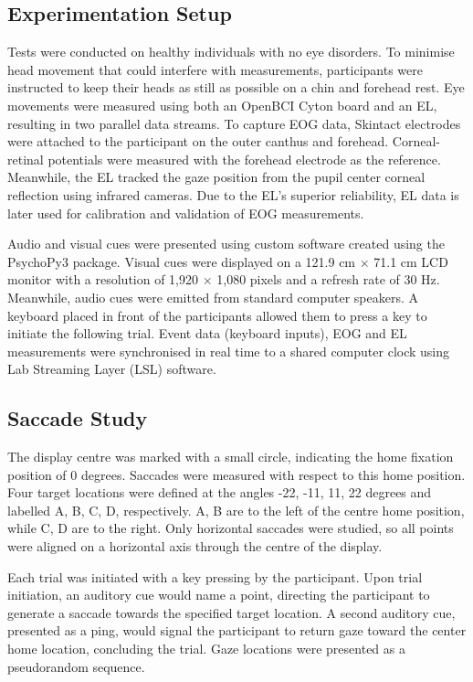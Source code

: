 \documentclass[transmag]{IEEEtran}
\begin{document}
\subsection{Experimentation Setup}
Tests were conducted on healthy individuals with no eye disorders. To minimise head movement that could interfere with measurements, participants were instructed to keep their heads as still as possible on a chin and forehead rest. Eye movements were measured using both an OpenBCI Cyton board and an EL, resulting in two parallel data streams. To capture EOG data, Skintact electrodes were attached to the participant on the outer canthus and forehead. Corneal-retinal potentials were measured with the forehead electrode as the reference. Meanwhile, the EL tracked the gaze position from the pupil center corneal reflection using infrared cameras. Due to the EL's superior reliability, EL data is later used for calibration and validation of EOG measurements.

Audio and visual cues were presented using custom software created using the PsychoPy3 package. Visual cues were displayed on a 121.9 \si{\centi\metre} $\times$ 71.1 \si{\centi\metre} LCD monitor with a resolution of 1,920 $\times$ 1,080 pixels and a refresh rate of 30 \si{\hertz}. Meanwhile, audio cues were emitted from standard computer speakers. A keyboard placed in front of the participants allowed them to press a key to initiate the following trial. Event data (keyboard inputs), EOG and EL measurements were synchronised in real time to a shared computer clock using Lab Streaming Layer (LSL) software.

\subsection{Saccade Study}

The display centre was marked with a small circle, indicating the home fixation position of 0 degrees. Saccades were measured with respect to this home position. Four target locations were defined at the angles -22, -11, 11, 22 degrees and labelled A, B, C, D, respectively. A, B are to the left of the centre home position, while C, D are to the right. Only horizontal saccades were studied, so all points were aligned on a horizontal axis through the centre of the display.

Each trial was initiated with a key pressing by the participant. Upon trial initiation, an auditory cue would name a point, directing the participant to generate a saccade towards the specified target location. A second auditory cue, presented as a ping, would signal the participant to return gaze toward the center home location, concluding the trial. Gaze locations were presented as a pseudorandom sequence.
\end{document}
